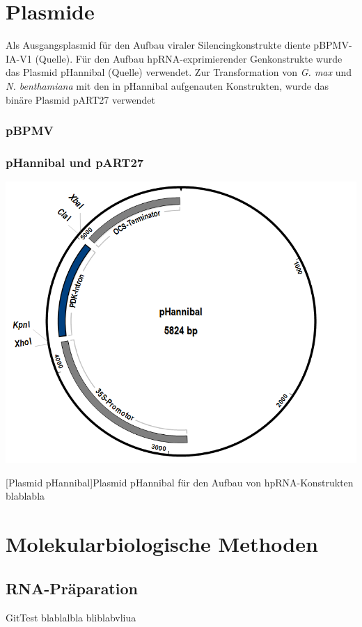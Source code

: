 \section{Plasmide}
Als Ausgangsplasmid für den Aufbau viraler Silencingkonstrukte diente pBPMV-IA-V1 (Quelle). Für den Aufbau  hpRNA-exprimierender Genkonstrukte wurde das Plasmid pHannibal (Quelle) verwendet. Zur Transformation von \textit{G. max} und \textit{N. benthamiana} mit den in pHannibal aufgenauten Konstrukten,  wurde das binäre Plasmid pART27 verwendet  

\subsubsection*{pBPMV}

\subsubsection*{pHannibal und pART27}
\begin{center}
\includegraphics[scale=.3]{MaterialMethoden/Abb/pHannibalgb1}
\end{center}
[Plasmid pHannibal]{Plasmid pHannibal für den Aufbau von hpRNA-Konstrukten\\ \footnotesize blablabla}
\par


\section{Molekularbiologische Methoden}
\subsection{RNA-Präparation}
GitTest blablalbla bliblabvliua